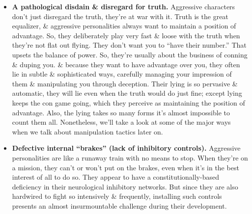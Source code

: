 \documentclass{article}
\numberwithin{equation}{section}
\begin{document}
\begin{itemize}
    \item \textbf{A pathological disdain \& disregard for truth.} Aggressive characters don't just disregard the truth, they're at war with it. Truth is the great equalizer, \& aggressive personalities always want to maintain a position of advantage. So, they deliberately play very fast \& loose with the truth when they're not flat out flying. They don't want you to ``have their number.'' That upsets the balance of power. So, they're usually about the business of conning \& duping you. \& because they want to have advantage over you, they often lie in subtle \& sophisticated ways, carefully managing your impression of them \& manipulating you through deception. Their lying is so pervasive \& automatic, they will lie even when the truth would do just fine; except lying keeps the con game going, which they perceive as maintaining the position of advantage. Also, the lying takes so many forms it's almost impossible to count them all. Nonetheless, we'll take a look at some of the major ways when we talk about manipulation tactics later on.
    \item \textbf{Defective internal ``brakes'' (lack of inhibitory controls).} Aggressive personalities are like a runaway train with no means to stop. When they're on a mission, they can't or won't put on the brakes, even when it's in the best interest of all to do so. They appear to have a constitutionally-based deficiency in their neurological inhibitory networks. But since they are also hardwired to fight so intensively \& frequently, installing such controls presents an almost insurmountable challenge during their development.
    

\end{itemize}
\end{document}
